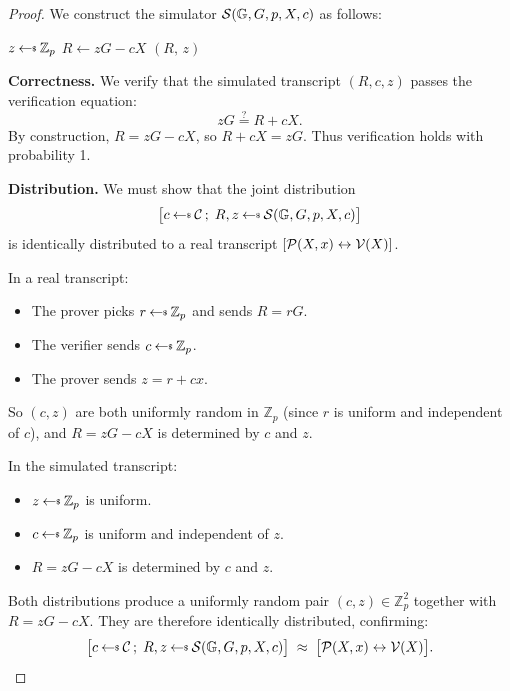 \documentclass[11pt]{article}
\begin{document}
\begin{proof}
We construct the simulator $\Sim(\mathbb{G}, G, p, X, c)$ as follows:

\begin{algorithm}[H]
\caption{$\Sim(\mathbb{G}, G, p, X, c)$}
\begin{algorithmic}[1]
  \State $z \getsr \mathbb{Z}_p$
  \State $R \leftarrow zG - cX$
  \State \Return $(R,\, z)$
\end{algorithmic}
\end{algorithm}

\noindent\textbf{Correctness.}  We verify that the simulated transcript
$(R, c, z)$ passes the verification equation:
\[
  zG \stackrel{?}{=} R + cX.
\]
By construction, $R = zG - cX$, so $R + cX = zG$.  Thus verification
holds with probability 1.

\noindent\textbf{Distribution.}  We must show that the joint distribution
\[
  \bigl[c \getsr \calC\,;\; R, z \getsr \Sim(\mathbb{G}, G, p, X, c)\bigr]
\]
is identically distributed to a real transcript
$[\mathcal{P}(X, x) \leftrightarrow \mathcal{V}(X)]$.

In a real transcript:
\begin{itemize}
  \item The prover picks $r \getsr \mathbb{Z}_p$ and sends $R = rG$.
  \item The verifier sends $c \getsr \mathbb{Z}_p$.
  \item The prover sends $z = r + cx$.
\end{itemize}
So $(c, z)$ are both uniformly random in $\mathbb{Z}_p$ (since $r$ is
uniform and independent of $c$), and $R = zG - cX$ is determined by
$c$ and $z$.

In the simulated transcript:
\begin{itemize}
  \item $z \getsr \mathbb{Z}_p$ is uniform.
  \item $c \getsr \mathbb{Z}_p$ is uniform and independent of $z$.
  \item $R = zG - cX$ is determined by $c$ and $z$.
\end{itemize}

Both distributions produce a uniformly random pair $(c, z) \in
\mathbb{Z}_p^2$ together with $R = zG - cX$.  They are therefore
identically distributed, confirming:
\[
  \bigl[c \getsr \calC\,;\; R, z \getsr \Sim(\mathbb{G}, G, p, X, c)\bigr]
  \;\approx\;
  \bigl[\prover(X, x) \leftrightarrow \verifier(X)\bigr].
\]
\end{proof}
\end{document}
